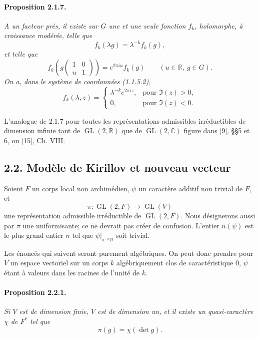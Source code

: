 \documentclass[10pt,a4paper]{article}
\providecommand{\GL}{\operatorname{GL}}
\providecommand{\R}{\mathbb R}
\providecommand{\C}{\mathbb C}
\begin{document}
\paragraph{Proposition 2.1.7.}{\itshape  A un facteur près, il existe sur \(G\) une et une seule fonction \(f_k\), holomorphe, à croissance modérée, telle que
\[
f_k(\lambda g)=\lambda^{-k}f_k(g),
\]
et telle que
\[
f_k\!\left(g\begin{pmatrix}1&0\\u&1\end{pmatrix}\right)
=
e^{2\pi i u}f_k(g)
\qquad(u\in\R,\ g\in G).
\]
On a, dans le système de coordonnées (1.1.5.2),
\[
\tag{2.1.7.1}
f_k(\lambda,z)=
\begin{cases}
\lambda^{-k}e^{2\pi iz},& \text{pour }\Im(z)>0,\\
0,& \text{pour }\Im(z)<0.
\end{cases}
\]

\par}
L'analogue de 2.1.7 pour toutes les représentations admissibles irréductibles de dimension infinie tant de \(\GL(2,\R)\) que de \(\GL(2,\C)\) figure dans [9], §§5 et 6, ou [15], Ch. VIII.

\subsection*{2.2. Modèle de Kirillov et nouveau vecteur}

Soient \(F\) un corps local non archimédien, \(\psi\) un caractère additif non trivial de \(F\), et
\[
\pi:\GL(2,F)\longrightarrow\GL(V)
\]
une représentation admissible irréductible de \(\GL(2,F)\). Nous désignerons aussi par \(\pi\) une uniformisante; ce ne devrait pas créer de confusion. L'entier \(n(\psi)\) est le plus grand entier \(n\) tel que \(\psi|_{\pi^{-n}\mathcal O}\) soit trivial.

Les énoncés qui suivent seront purement algébriques. On peut donc prendre pour \(V\) un espace vectoriel sur un corps \(k\) algébriquement clos de caractéristique \(0\), \(\psi\) étant à valeurs dans les racines de l'unité de \(k\).

\paragraph{Proposition 2.2.1.}{\itshape  Si \(V\) est de dimension finie, \(V\) est de dimension un, et il existe un quasi-caractère \(\chi\) de \(F^*\) tel que
\[
\pi(g)=\chi(\det g).
\]\par}
\end{document}
